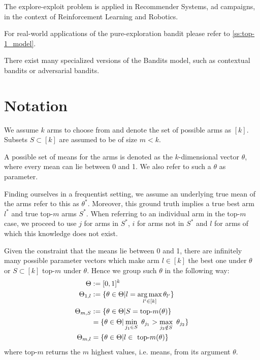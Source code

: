 The explore-exploit problem is applied in Recommender Systems, ad campaigns, in the context of Reinforcement Learning and Robotics.

For real-world applications of the pure-exploration bandit please refer to \ref{ss:top-1_model}.

There exist many specialized versions of the Bandits model, such as contextual bandits or adversarial bandits.

\section{Notation}\label{section:notation}
We assume $k$ arms to choose from and denote the set of possible arms as $[k]$. Subsets $S \subset [k]$ are assumed to be of size $m < k$.

A possible set of means for the arms is denoted as the $k$-dimensional vector $\theta$, where every mean can lie between 0 and 1. We also refer to such a $\theta$ as parameter.

Finding ourselves in a frequentist setting, we assume an underlying true mean of the arms refer to this as $\theta^*$. Moreover, this ground truth implies a true best arm $l^*$ and true top-$m$ arms $S^*$. When referring to an individual arm in the top-$m$ case, we proceed to use $j$ for arms in $S^*$, $i$ for arms not in $S^*$ and $l$ for arms of which this knowledge does not exist.

Given the constraint that the means lie between 0 and 1, there are infinitely many possible parameter vectors which make arm $l \in [k]$ the best one under $\theta$ or $S \subset [k]$ top-$m$ under $\theta$. Hence we group such $\theta$ in the following way:
\begin{align}
  \Theta &:= [0, 1]^k \\
  \Theta_{1, l} &:= \{\theta \in \Theta | l = \operatorname*{arg\,max}_{l' \in [k]} \theta_{l'}\} \\
  \Theta_{m, S} &:= \{\theta \in \Theta | S = \text{top-}m(\theta)\} \\
    &= \{ \theta \in \Theta| \min_{j_1 \in S}\ \theta_{j_1} > \max_{j_2 \notin S}\ \theta_{j_2}\} \\
  \Theta_{m, l} &= \{\theta \in \Theta | l \in \text{ top-}m(\theta)\}
\end{align}
where top-$m$ returns the $m$ highest values, i.e. means, from its argument $\theta$.

